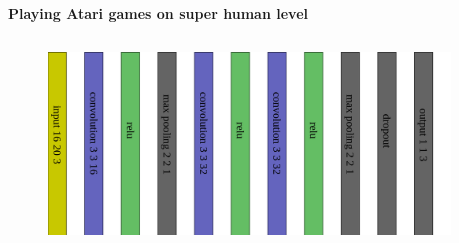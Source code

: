 \documentclass[xcolor=dvipsnames]{beamer}
\begin{document}
\begin{frame}{\bf Playing Atari games on super human level}

\begin{columns}

    \begin{column}{0.5\textwidth}




        \begin{figure}
        \includegraphics[scale=0.18]{../../diagrams/arkanoid_net.png}
        \end{figure}

    \end{column}

    \begin{column}{0.5\textwidth}  %


\end{column}
\end{columns}
\end{frame}
\end{document}
